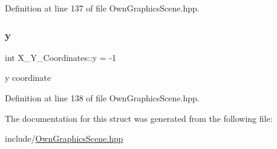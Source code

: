 Definition at line 137 of file Own\+Graphics\+Scene.\+hpp.

\mbox{\label{structX__Y__Coordinates_a4a608b81d10b65d5b12596ca82df34f6}} 
\subsubsection{\texorpdfstring{y}{y}}
{\footnotesize\ttfamily int X\+\_\+\+Y\+\_\+\+Coordinates\+::y = -\/1}

y coordinate 

Definition at line 138 of file Own\+Graphics\+Scene.\+hpp.



The documentation for this struct was generated from the following file\+:\begin{DoxyCompactItemize}
\item 
include/\mbox{\hyperlink{OwnGraphicsScene_8hpp}{Own\+Graphics\+Scene.\+hpp}}\end{DoxyCompactItemize}
